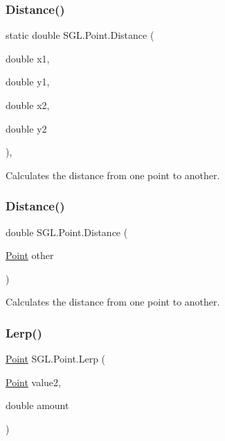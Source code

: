 \subsubsection{\texorpdfstring{Distance()}{Distance()}\hspace{0.1cm}{\footnotesize\ttfamily [1/2]}}
{\footnotesize\ttfamily static double S\+G\+L.\+Point.\+Distance (\begin{DoxyParamCaption}\item[{double}]{x1,  }\item[{double}]{y1,  }\item[{double}]{x2,  }\item[{double}]{y2 }\end{DoxyParamCaption})\hspace{0.3cm}{\ttfamily [inline]}, {\ttfamily [static]}}



Calculates the distance from one point to another. 

\mbox{\label{struct_s_g_l_1_1_point_aa44e48a67f96810b5483955a80426442}} 
\subsubsection{\texorpdfstring{Distance()}{Distance()}\hspace{0.1cm}{\footnotesize\ttfamily [2/2]}}
{\footnotesize\ttfamily double S\+G\+L.\+Point.\+Distance (\begin{DoxyParamCaption}\item[{\mbox{\hyperlink{struct_s_g_l_1_1_point}{Point}}}]{other }\end{DoxyParamCaption})\hspace{0.3cm}{\ttfamily [inline]}}



Calculates the distance from one point to another. 

\mbox{\label{struct_s_g_l_1_1_point_a4680568d8a9b123e6ffaf27ec22030ff}} 
\subsubsection{\texorpdfstring{Lerp()}{Lerp()}}
{\footnotesize\ttfamily \mbox{\hyperlink{struct_s_g_l_1_1_point}{Point}} S\+G\+L.\+Point.\+Lerp (\begin{DoxyParamCaption}\item[{\mbox{\hyperlink{struct_s_g_l_1_1_point}{Point}}}]{value2,  }\item[{double}]{amount }\end{DoxyParamCaption})\hspace{0.3cm}{\ttfamily [inline]}}



